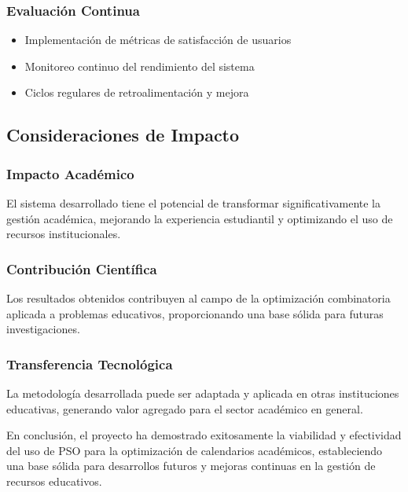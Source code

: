 \subsubsection{Evaluación Continua}
\begin{itemize}
    \item Implementación de métricas de satisfacción de usuarios
    \item Monitoreo continuo del rendimiento del sistema
    \item Ciclos regulares de retroalimentación y mejora
\end{itemize}

\subsection{Consideraciones de Impacto}

\subsubsection{Impacto Académico}
El sistema desarrollado tiene el potencial de transformar significativamente la gestión académica, mejorando la experiencia estudiantil y optimizando el uso de recursos institucionales.

\subsubsection{Contribución Científica}
Los resultados obtenidos contribuyen al campo de la optimización combinatoria aplicada a problemas educativos, proporcionando una base sólida para futuras investigaciones.

\subsubsection{Transferencia Tecnológica}
La metodología desarrollada puede ser adaptada y aplicada en otras instituciones educativas, generando valor agregado para el sector académico en general.

En conclusión, el proyecto ha demostrado exitosamente la viabilidad y efectividad del uso de PSO para la optimización de calendarios académicos, estableciendo una base sólida para desarrollos futuros y mejoras continuas en la gestión de recursos educativos.
